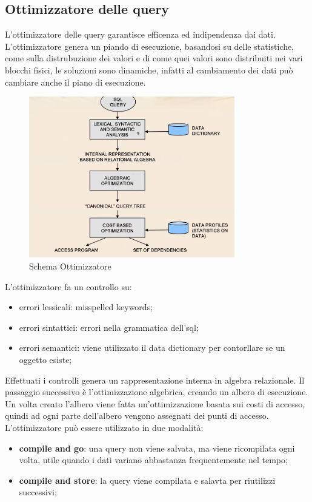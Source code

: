 \documentclass[12pt]{article}
\begin{document}
\subsection{Ottimizzatore delle query}
L'ottimizzatore delle query garantisce efficenza ed indipendenza dai dati. L'ottimizzatore genera un piando di esecuzione, basandosi su delle statistiche, come sulla distrubuzione dei valori e di come quei valori sono distribuiti nei vari blocchi fisici, le soluzioni sono dinamiche, infatti al cambiamento dei dati pu\`o cambiare anche il piano di esecuzione.
\begin{figure}[H]
    \centering
    \includegraphics[width=0.8\textwidth]{schema-ottimizzatore.png}
    \caption{Schema Ottimizzatore}
    \label{fig:schema-ottimizzatore}
\end{figure}
L'ottimizzatore fa un controllo su:
\begin{itemize}
    \item errori lessicali: misspelled keywords;
    \item errori sintattici: errori nella grammatica dell'sql;
    \item errori semantici: viene utilizzato il data dictionary per contorllare se un oggetto esiste;
\end{itemize}
Effettuati i controlli genera un rappresentazione interna in algebra relazionale. Il passaggio successivo \`e l'ottimizzazione algebrica, creando un albero di esecuzione. Un volta creato l'albero viene fatta un'ottimizzazione basata sui costi di accesso, quindi ad ogni parte dell'albero vengono assegnati dei punti di accesso. L'ottimizzatore pu\`o essere utilizzato in due modalit\`a:
\begin{itemize}
    \item \textbf{compile and go}: una query non viene salvata, ma viene ricompilata ogni volta, utile quando i dati variano abbastanza frequentemente nel tempo;
    \item \textbf{compile and store}: la query viene compilata e salavta per riutilizzi successivi;
\end{itemize}
\end{document}
